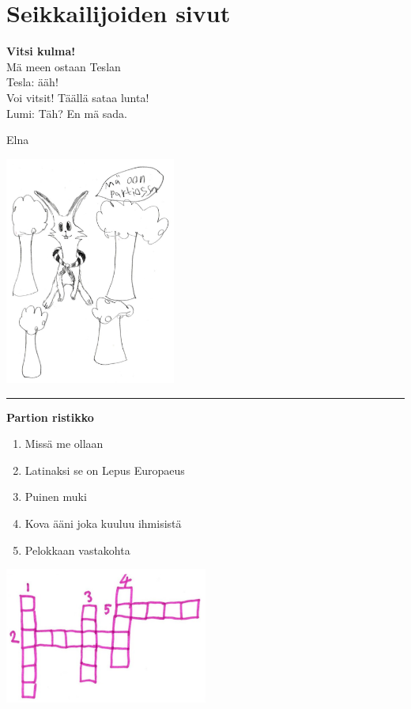 
\section{Seikkailijoiden sivut}


\vspace*{-0.32cm}
\begin{multicols}{2}
\noindent \textbf{Vitsi kulma!\\}
\bigskip
Mä meen ostaan Teslan\\
Tesla: ääh!\\
\bigskip
Voi vitsit! Täällä sataa lunta!\\
Lumi: Täh? En mä sada.

\vfill
\noindent Elna

\columnbreak
\includegraphics[width=0.42\textwidth]{assets/seikkailijat2}
\end{multicols}

\hrule

\begin{multicols}{2}
\noindent\textbf{Partion ristikko}
\begin{enumerate}
	\item Missä me ollaan
	\item Latinaksi se on Lepus Europaeus
	\item Puinen muki
	\item Kova ääni joka kuuluu ihmisistä
	\item Pelokkaan vastakohta
\end{enumerate}
\columnbreak
\includegraphics[width=0.5\textwidth]{assets/seikkailijat1}
\end{multicols}



